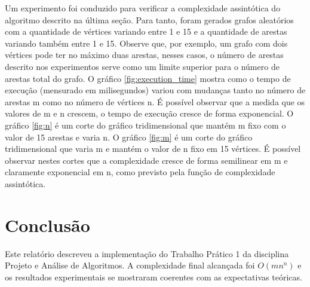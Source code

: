 \documentclass{report}
\begin{document}
Um experimento foi conduzido para verificar a complexidade assintótica do algoritmo descrito na última seção. Para tanto,
foram gerados grafos aleatórios com a quantidade de vértices variando entre 1 e 15 e a quantidade de arestas variando
também entre 1 e 15. Observe que, por exemplo, um grafo com dois vértices pode ter no máximo duas arestas, nesses casos, 
o número de arestas descrito nos experimentos serve como um limite superior para o número de arestas total do grafo. O
gráfico \ref{fig:execution_time} mostra como o tempo de execução (mensurado em milisegundos) variou com mudanças tanto no número de arestas m como
no número de vértices n. É possível observar que a medida que os valores de m e n crescem, o tempo de execução cresce de forma exponencial.
O gráfico \ref{fig:n} é um corte do gráfico tridimensional que mantém m fixo com o valor de 15 arestas e varia n. O gráfico \ref{fig:m} é um corte
do gráfico tridimensional que varia m e mantém o valor de n fixo em 15 vértices. 
É possível observar nestes cortes que a complexidade cresce de forma semilinear em m e claramente exponencial em n, como
previsto pela função de complexidade assintótica. 

\chapter{Conclusão}

Este relatório descreveu a implementação do Trabalho Prático 1 da disciplina Projeto e Análise de Algoritmos. A complexidade
final alcançada foi $ O(mn^n) $ e os resultados experimentais se mostraram coerentes com as expectativas teóricas.
\end{document}
